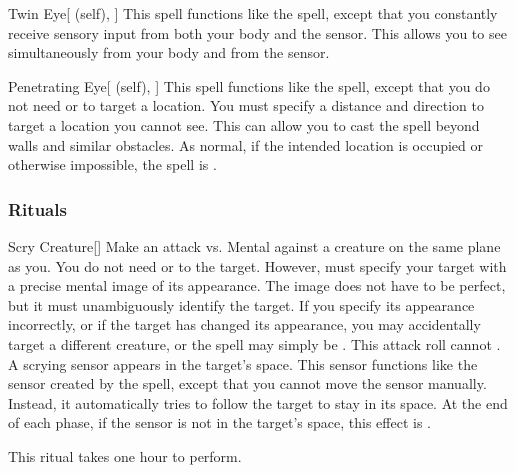 \lowercase{\hypertarget{spell:Twin Eye}{}}\label{spell:Twin Eye}
\begin{attuneability}[\nth{3}]{\hypertarget{spell:Twin Eye}{Twin Eye}}[ (self), ]
This spell functions like the  spell, except that you constantly receive sensory input from both your body and the sensor.
This allows you to see simultaneously from your body and from the sensor.
\end{attuneability}
\vspace{0.25em}



\lowercase{\hypertarget{spell:Penetrating Eye}{}}\label{spell:Penetrating Eye}
\begin{attuneability}[\nth{4}]{\hypertarget{spell:Penetrating Eye}{Penetrating Eye}}[ (self), ]
This spell functions like the  spell, except that you do not need  or  to target a location.
You must specify a distance and direction to target a location you cannot see.
This can allow you to cast the spell beyond walls and similar obstacles.
As normal, if the intended location is occupied or otherwise impossible, the spell is .
\end{attuneability}
\vspace{0.25em}



\subsubsection{Rituals}


\lowercase{\hypertarget{spell:Scry Creature}{}}\label{spell:Scry Creature}
\begin{freeability}[\nth{4}]{\hypertarget{spell:Scry Creature}{Scry Creature}}[]
Make an attack vs. Mental against a creature on the same plane as you.
You do not need  or  to the target.
However,  must specify your target with a precise mental image of its appearance.
The image does not have to be perfect, but it must unambiguously identify the target.
If you specify its appearance incorrectly, or if the target has changed its appearance, you may accidentally target a different creature, or the spell may simply be .
This attack roll cannot .
\hit A scrying sensor appears in the target's space.
This sensor functions like the sensor created by the  spell, except that you cannot move the sensor manually.
Instead, it automatically tries to follow the target to stay in its space.
At the end of each phase, if the sensor is not in the target's space, this effect is .

This ritual takes one hour to perform.
\end{freeability}
\vspace{0.25em}



